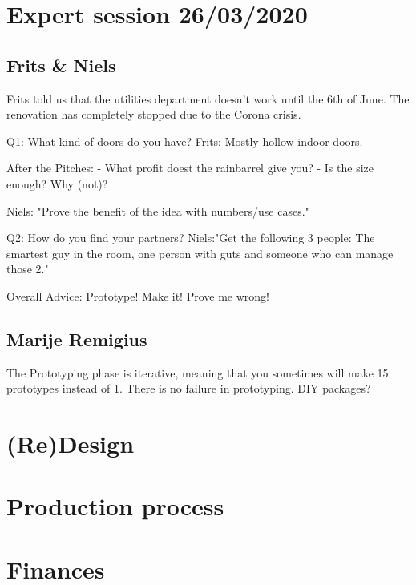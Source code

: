 \documentclass[11pt]{article}
\begin{document}
	
	\section{Expert session 26/03/2020}
	
	\subsection{Frits \& Niels}
	Frits told us that the utilities department doesn't work until the 6th of June. The renovation has completely stopped due to the Corona crisis.
	
	Q1: What kind of doors do you have? Frits: Mostly hollow indoor-doors.
	
	After the Pitches:
	- What profit doest the rainbarrel give you?
	- Is the size enough? Why (not)?
	
	Niels: "Prove the benefit of the idea with numbers/use cases."
	
	Q2: How do you find your partners? Niels:"Get the following 3 people: The smartest guy in the room, one person with guts and someone who can manage those 2."
	
	Overall Advice: Prototype! Make it! Prove me wrong!
	
	
	\subsection{Marije Remigius}
	The Prototyping phase is iterative, meaning that you sometimes will make 15 prototypes instead of 1. There is no failure in prototyping. DIY packages?
	
	
	\section{(Re)Design}
	
	\section{Production process}
	
	\section{Finances}
	
	
	\appendix
	
	
\end{document}
